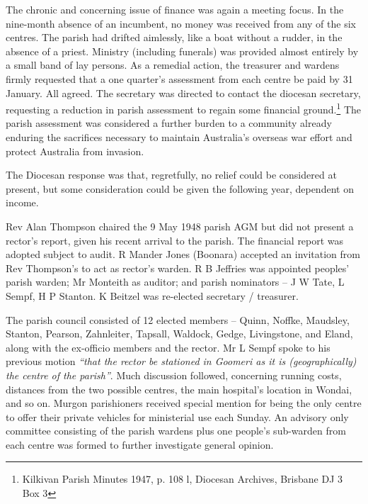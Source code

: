 The chronic and concerning issue of finance was again a meeting focus. In the nine-month absence of an incumbent, no money was received from any of the six centres. The parish had drifted aimlessly, like a boat without a rudder, in the absence of a priest. Ministry (including funerals) was provided almost entirely by a small band of lay persons. As a remedial action, the treasurer and wardens firmly requested that a one quarter's assessment from each centre be paid by 31 January. All agreed. The secretary was directed to contact the diocesan secretary, requesting a reduction in parish assessment to regain some financial ground.\footnote{Kilkivan Parish Minutes 1947, p. 108 l, Diocesan Archives, Brisbane DJ 3 Box 3} The parish assessment was considered a further burden to a community already enduring the sacrifices necessary to maintain Australia's overseas war effort and protect Australia from invasion.


The Diocesan response was that, regretfully, no relief could be considered at present, but some consideration could be given the following year, dependent on income.



Rev Alan Thompson chaired the 9 May 1948 parish AGM but did not present a rector's report, given his recent arrival to the parish. The financial report was adopted subject to audit. R Mander Jones (Boonara) accepted an invitation from Rev Thompson's to act as rector's warden. R B Jeffries was appointed peoples' parish warden; Mr Monteith as auditor; and parish nominators -- J W Tate, L Sempf, H P Stanton. K Beitzel was re-elected secretary / treasurer.



The parish council consisted of 12 elected members -- Quinn, Noffke, Maudsley, Stanton, Pearson, Zahnleiter, Tapsall, Waldock, Gedge, Livingstone, and Eland, along with the ex-officio members and the rector. Mr L Sempf spoke to his previous motion \emph{``that the rector be stationed in Goomeri as it is (geographically) the centre of the parish''}. Much discussion followed, concerning running costs, distances from the two possible centres, the main hospital's location in Wondai, and so on. Murgon parishioners received special mention for being the only centre to offer their private vehicles for ministerial use each Sunday. An advisory only committee consisting of the parish wardens plus one people's sub-warden from each centre was formed to further investigate general opinion.



